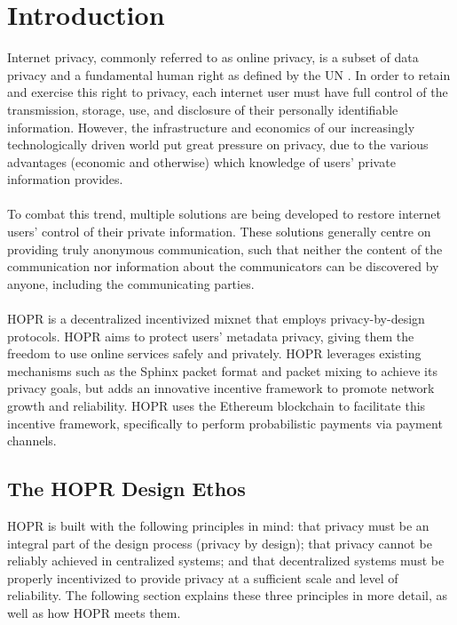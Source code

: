 
\section{Introduction}
\label{sec:introduction}

Internet privacy, commonly referred to as online privacy, is a subset of data privacy and a fundamental human right as defined by the UN \cite{un2018}.
In order to retain and exercise this right to privacy, each internet user must have full control of the transmission, storage, use, and disclosure of their
personally identifiable information. However, the infrastructure and economics of our increasingly technologically driven world put great pressure on privacy, due to the various advantages (economic and otherwise) which knowledge of users' private information provides. 
\\~\\To combat this trend, multiple solutions are being developed to restore internet users' control of their private information. These solutions generally centre on providing truly anonymous communication, such that neither the content of the communication nor information about the communicators can be discovered by anyone, including the communicating parties.
\\~\\HOPR is a decentralized incentivized mixnet that employs privacy-by-design protocols. HOPR aims to protect users' metadata privacy, giving them the
freedom to use online services safely and privately. HOPR leverages existing mechanisms such as the Sphinx packet format
\cite{sphinxpaper} and packet mixing to achieve its privacy goals, but adds an innovative incentive framework to promote network growth and reliability. HOPR uses the
Ethereum blockchain \cite{ethereum} to facilitate this incentive framework, specifically to perform probabilistic payments via payment channels. 


\subsection{The HOPR Design Ethos}
\label{sec:vision}

HOPR is built with the following principles in mind: that privacy must be an integral part of the design process (privacy by design); that privacy cannot be reliably achieved in centralized systems; and that decentralized systems must be properly incentivized to provide privacy at a sufficient scale and level of reliability. The following section explains these three principles in more detail, as well as how HOPR meets them.

